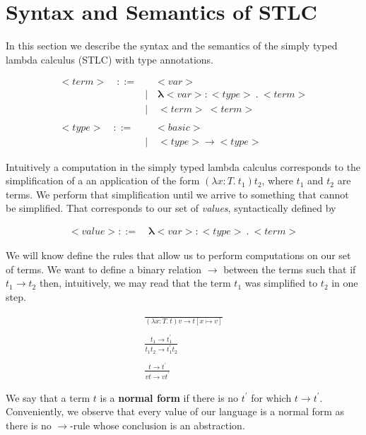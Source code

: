 \section{Syntax and Semantics of STLC}

In this section we describe the syntax and the semantics of the simply typed lambda calculus (STLC) with type annotations. 

\begin{align*}
{<}term{>} \quad ::=& \quad  {<}var{>} \tag{variable}\\ 
&| \quad \bm{\lambda} {<}var{>}\bm{:}{<}type{>} \ \bm{.} \ {<}term{>} \tag{abstraction}\\
&| \quad {<}term{>} \ {<}term{>} \tag{application}\\
\\
{<}type{>} \quad::=& \quad {<}basic{>} \tag{basic type}\\
&| \quad {<}type{>} \bm{\to} {<}type{>} \tag{functional type}
\end{align*}

Intuitively a computation in the simply typed lambda calculus corresponds to the simplification of a an application of the form $(\lambda x:T . \ t_{1})t_{2}$, where $t_1$ and $t_2$ are terms. We perform that simplification until we arrive to something that cannot be simplified. That corresponds to our set of \emph{values}, syntactically defined by 

\begin{align*}
{<} value {>} ::= \quad \bm{\lambda} {<}var{>}\bm{:}{<}type{>} \ \bm{.} \ {<}term{>}  \tag{value}
\end{align*} 

We will know define the rules that allow us to perform computations on our set of terms. We want to define a binary relation $\to$ between the terms such that if $t_1 \to t_2$ then, intuitively, we may read that the term $t_1$ was simplified to $t_2$ in one step. 


\begin{align*}
\frac
{}
{(\lambda x:T . \ t)v \to t[x \mapsto v]} \label{rule:lambda1} \tag{$\lambda1$} \\
\\
\frac
{t_1 \to t^{'}_1}
{t_1 t_2 \to t^{'}_1 t_2}  \label{rule:lambda2}\tag{$\lambda2$}\\ 
\\
\frac 
{t \to t^{'}}
{vt \to vt^{'}} \label{rule:lambda3} \tag{$\lambda3$}
\end{align*}


We say that a term $t$ is a \textbf{normal form} if there is no $t^{'}$ for which $t \to t^{'}$. Conveniently, we observe that every value of our language is a normal form as there is no $\to$-rule whose conclusion is an abstraction. 

